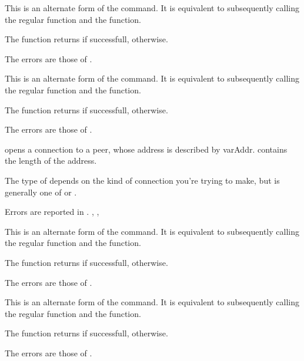 

{ This is an alternate form of the  command. It is equivalent
to subsequently calling the regular 
function and the  function.

The function returns  if successfull,  otherwise.
}
{The errors are those of .}
{}

{ This is an alternate form of the  command. 
It is equivalent
to subsequently calling the regular  function and the 
 function.

The function returns  if successfull,  otherwise.
}
{The errors are those of .}
{}


{ opens a connection to a peer, whose address is described by
var{Addr}.  contains the length of the address.

The type of  depends on the kind of connection you're trying to
make, but is generally one of  or .
}
{Errors are reported in .}
{, ,}



{ This is an alternate form of the  command. 
It is equivalent
to subsequently calling the regular  function and the 
 function.

The function returns  if successfull,  otherwise.
}{The errors are those of .}
{}

{ This is an alternate form of the  command. 
It is equivalent
to subsequently calling the regular  function and the 
 function.

The function returns  if successfull,  otherwise.
}{The errors are those of .}
{}


